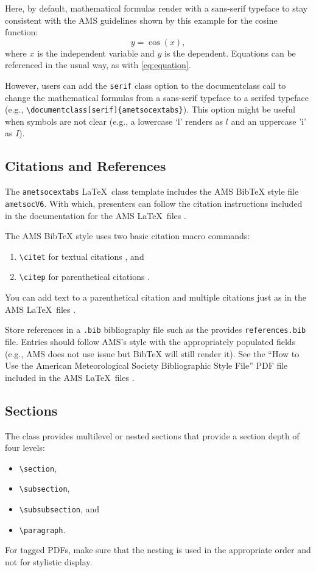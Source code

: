 \documentclass[9pt]{ametsocextabs}
\begin{document}
Here, by default, mathematical formulas render with a sans-serif
typeface to stay consistent with the AMS guidelines shown by this
example for the cosine function:
\begin{equation}
    y = \cos (x),
    \label{eq:equation}
\end{equation}
where $x$ is the independent variable and $y$ is the dependent.
Equations can be referenced in the usual way, as with \eqref{eq:equation}.

However, users can add the \texttt{serif} class option to the
documentclass call to change the mathematical formulas from a
sans-serif typeface to a serifed typeface (e.g.,
\texttt{\textbackslash documentclass[serif]\{ametsocextabs\}}). This
option might be useful when symbols are not clear (e.g., a lowercase
`l' renders as $l$ and an uppercase 'i' as $I$).

\subsection{Citations and References}
The \lowercase{\texttt{ametsocextabs}} \LaTeX\ class template
includes the AMS BibTeX style file \texttt{ametsocV6}. With which,
presenters can follow the citation instructions included in the
documentation for the AMS \LaTeX\ files \cite{AMS2025latex, AMS2025doc}.

The AMS BibTeX style uses two basic citation macro commands:
\begin{enumerate}
    \item \texttt{\textbackslash citet} for textual citations \rightarrow \citet{Eliassen1951}, and
    \item \texttt{\textbackslash citep} for parenthetical citations  \rightarrow \citep{Eliassen1951}.
\end{enumerate}
You can add text to a parenthetical citation and multiple
citations just as in the AMS \LaTeX\ files
\citep[e.g.,][]{Eliassen1951,AMS2025latex, AMS2025doc}.

Store references in a \texttt{.bib} bibliography file such as the
provides \texttt{references.bib} file. Entries should follow AMS's
style with the appropriately populated fields (e.g., AMS does not
use issue but BibTeX will still render it). See the ``How to Use the
American Meteorological Society Bibliographic Style File'' PDF file
included in the AMS \LaTeX\ files \cite{AMS2025latex, AMS2025doc}.

\subsection{Sections}
The class provides multilevel or nested sections that provide
a section depth of four levels:
\begin{itemize}
    \item \texttt{\textbackslash section},
    \item \texttt{\textbackslash subsection},
    \item \texttt{\textbackslash subsubsection}, and
    \item \texttt{\textbackslash paragraph}.
\end{itemize}
For tagged PDFs, make sure that the nesting is used in the
appropriate order and not for stylistic display.
\end{document}
